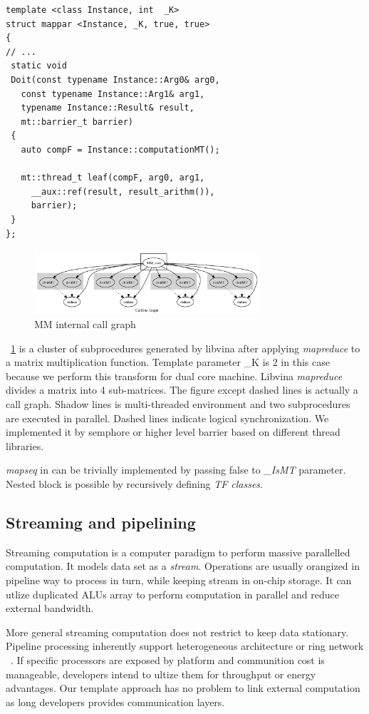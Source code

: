 \documentclass[10pt, conference, compsocconf]{IEEEtran}
\begin{document}
\makebox[3.1\width]{\hrulefill}
\begin{verbatim}
template <class Instance, int  _K>
struct mappar <Instance, _K, true, true> 
{
// ...
 static void 
 Doit(const typename Instance::Arg0& arg0, 
   const typename Instance::Arg1& arg1,
   typename Instance::Result& result,
   mt::barrier_t barrier)
 {
   auto compF = Instance::computationMT();

   mt::thread_t leaf(compF, arg0, arg1, 
     __aux::ref(result, result_arithm()), 
     barrier);
 }
};
\end{verbatim}

\begin{figure}
\centering
\includegraphics[width=3.3in]{test_matrix}
\caption{MM internal call graph}
\label{fig:mm}
\end{figure}

~\ref{fig:mm} is a cluster of subprocedures generated by libvina after applying \emph{mapreduce} to a matrix multiplication function. Template parameter \_K is 2 in this case because we perform this transform for dual core machine. Libvina \emph{mapreduce} divides a matrix into 4 sub-matrices. The figure except dashed lines is actually a call graph. Shadow lines is multi-threaded environment and two subprocedures are executed in parallel. Dashed lines indicate logical synchronization. We implemented it by semphore or higher level barrier based on different thread libraries.

\emph{mapseq} in \cite{b1} can be trivially implemented by passing false to \emph{\_IsMT} parameter. Nested block is possible by recursively defining \emph{TF classes}.

\subsection{Streaming and pipelining}
Streaming computation is a computer paradigm to perform massive parallelled computation. It models data set as a \emph{stream}. Operations are usually orangized in pipeline way to process in turn, while keeping stream in on-chip storage. It can utlize duplicated ALUs array to perform computation in parallel and reduce external bandwidth. 

More general streaming computation does not restrict to keep data stationary. Pipeline processing inherently support heterogeneous architecture or ring network ~\cite{b19,b14}. If specific processors are exposed by platform and communition cost is manageable, developers intend to ultize them for throughput or energy advantages. Our template approach has no problem to link external computation as long developers provides communication layers.
\end{document}
